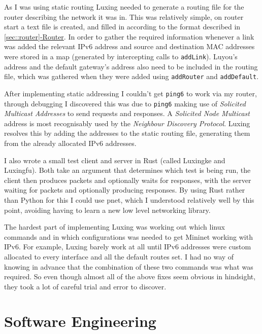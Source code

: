 \documentclass[12pt,a4paper,twoside,openany]{report}
\begin{document}
\bigskip

As I was using static routing Luxing needed to generate a routing file for the router describing the network it was in.  This was relatively simple, on router start a text file is created, and filled in according to the format described in \ref{sec::router}\hyperref[sec::router]{-Router}.  In order to gather the required information whenever a link was added the relevant IPv6 address and source and destination MAC addresses were stored in a map (generated by intercepting calls to \verb!addLink!).  Luyou's address and the default gateway's address also need to be included in the routing file, which was gathered when they were added using \verb!addRouter! and \verb!addDefault!.

\bigskip

After implementing static addressing I couldn't get \verb!ping6! to work via my router, through debugging I discovered this was due to \verb!ping6! making use of \textit{Solicited Multicast Addresses} to send requests and responses. A \textit{Solicited Node Multicast} address is most recognisably used by the \textit{Neighbour Discovery Protocol}\cite{ndp_rfc}. Luxing resolves this by adding the addresses to the static routing file, generating them from the already allocated IPv6 addresses.

\bigskip

I also wrote a small test client and server in Rust (called Luxingke and Luxingfu).  Both take an argument that determines which test is being run, the client then produces packets and optionally waits for responses, with the server waiting for packets and optionally producing responses.  By using Rust rather than Python for this I could use pnet, which I understood relatively well by this point, avoiding having to learn a new low level networking library.

\bigskip

The hardest part of implementing Luxing was working out which linux commands and in which configurations was needed to get Mininet working with IPv6.  For example, Luxing barely work at all until IPv6 addresses were custom allocated to every interface and all the default routes set.  I had no way of knowing in advance that the combination of these two commands was what was required.  So even though almost all of the above fixes seem obvious in hindsight, they took a lot of careful trial and error to discover.

\section{Software Engineering}
\label{sec::soft_eng}
\end{document}
